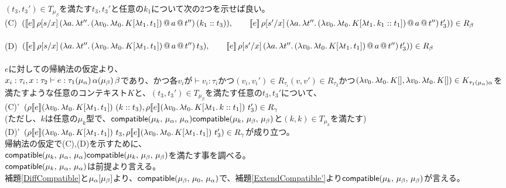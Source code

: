 $(t_3,t_3')\in T_{\mu_{\beta}}$を満たす$t_3, t_3'$と任意の$k_1$について次の2つを示せば良い。\\
(C)\ $(\CPS{e}{\rho[\Change{x}{s}]}
           {\LamP{a}{\Lam{t''}
               {\App{\App{\LamP{v_0}{\Lam{t_0}{K[\Lam{t_1}{t_1}]}}}{a}}{t''}}}}{\ConsP{k_1}{t_3}}),\\
  \qquad \CPS{e}{\rho[\Change{x}{s'}]}
           {\LamP{a}{\Lam{t''}
               {\App{\App{\LamP{v_0}{\Lam{t_0}{K[\Lam{t_1}{\Cons{k_1}{t_1}}]}}}{a}}{t''}}}}{t_3'}))\in R_{\beta}$\\
\\
(D)\ $(\CPS{e}{\rho[\Change{x}{s}]}
           {\LamP{a}{\Lam{t''}
               {\App{\App{\LamP{v_0}{\Lam{t_0}{K[\Lam{t_1}{t_1}]}}}{a}}{t''}}}}{t_3}),\\
  \qquad \CPS{e}{\rho[\Change{x}{s'}]}
           {\LamP{a}{\Lam{t''}
               {\App{\App{\LamP{v_0}{\Lam{t_0}{K[\Lam{t_1}{t_1}]}}}{a}}{t''}}}}{t_3'}))\in R_{\beta}$\\
\\
$e$に対しての帰納法の仮定より、\\
$x_i:\tau_i, x:\tau_2 \vdash e:\tau_1 \TrailType{\alpha} \TrailType{\beta}$であり、かつ各$v_i$が$\vdash v_i:\tau_i$かつ$(v_i,v_i') \in R_{\tau_i} (v, v')\in R_{\tau_2}$かつ$(\Lam{v_0}{\Lam{t_0}{K[]}}, \Lam{v_0}{\Lam{t_0}{K[]}})\in  K_{\tau_1(\mu_{\alpha})\alpha}$を満たすような任意のコンテキスト$K$と、$(t_3, t_3') \in T_{\mu_{\beta}}$を満たす任意の$t_3, t_3'$について、\\
(C)'\ $(\rho \CPSTh{e} \LamP{v_0}{\Lam{t_0}{K[\Lam{t_1}{t_1}]}}\ \ConsP{k}{t_3}, \rho \CPSTh{e} \LamP{v_0}{\Lam{t_0}{K[\Lam{t_1}{\Cons{k}{t_1}}]}}\ t_3')\in R_{\gamma}$\\
(ただし、$k$は任意の$\mu_k$型で、$\Compatible{\mu_k}{\mu_{\alpha}}{\mu_{\alpha}} \Compatible{\mu_k}{\mu_{\beta}}{\mu_{\beta}}$と$(k,k)\in T_{\mu_k}$を満たす)\\
(D)'\ $(\rho \CPSTh{e} \LamP{v_0}{\Lam{t_0}{K[\Lam{t_1}{t_1}]}}\ t_3, \rho \CPSTh{e} \LamP{v_0}{\Lam{t_0}{K[\Lam{t_1}{t_1}]}}\ t_3')\in R_{\gamma}$が成り立つ。\\
帰納法の仮定で(C),(D)を示すために、\\
$\Compatible{\mu_k}{\mu_{\alpha}}{\mu_{\alpha}} \Compatible{\mu_k}{\mu_{\beta}}{\mu_{\beta}}$を満たす事を調べる。\\
$\Compatible{\mu_k}{\mu_{\alpha}}{\mu_{\alpha}}$は前提より言える。\\
補題\ref{DiffCompatible}と$\Trails{\mu_{\alpha}}{\mu_{\beta}}$より、$\Compatible{\mu_{\beta}}{\mu_0}{\mu_{\alpha}}$で、補題\ref{ExtendCompatible'}より$\Compatible{\mu_k}{\mu_{\beta}}{\mu_{\beta}}$が言える。\\
